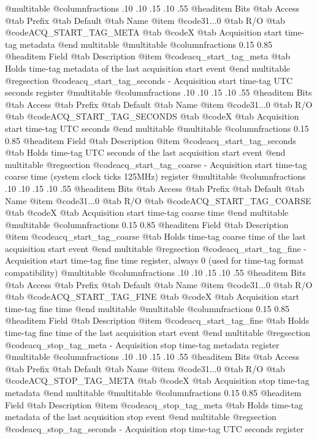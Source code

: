 @multitable @columnfractions .10 .10 .15 .10 .55
@headitem Bits @tab Access @tab Prefix @tab Default @tab Name
@item @code{31...0}
@tab R/O @tab
@code{ACQ_START_TAG_META}
@tab @code{X} @tab 
Acquisition start time-tag metadata
@end multitable
@multitable @columnfractions 0.15 0.85
@headitem Field @tab Description
@item @code{acq_start_tag_meta} @tab Holds time-tag metadata of the last acquisition start event
@end multitable
@regsection @code{acq_start_tag_seconds} - Acquisition start time-tag UTC seconds register
@multitable @columnfractions .10 .10 .15 .10 .55
@headitem Bits @tab Access @tab Prefix @tab Default @tab Name
@item @code{31...0}
@tab R/O @tab
@code{ACQ_START_TAG_SECONDS}
@tab @code{X} @tab 
Acquisition start time-tag UTC seconds
@end multitable
@multitable @columnfractions 0.15 0.85
@headitem Field @tab Description
@item @code{acq_start_tag_seconds} @tab Holds time-tag UTC seconds of the last acquisition start event
@end multitable
@regsection @code{acq_start_tag_coarse} - Acquisition start time-tag coarse time (system clock ticks 125MHz) register
@multitable @columnfractions .10 .10 .15 .10 .55
@headitem Bits @tab Access @tab Prefix @tab Default @tab Name
@item @code{31...0}
@tab R/O @tab
@code{ACQ_START_TAG_COARSE}
@tab @code{X} @tab 
Acquisition start time-tag coarse time
@end multitable
@multitable @columnfractions 0.15 0.85
@headitem Field @tab Description
@item @code{acq_start_tag_coarse} @tab Holds time-tag coarse time of the last acquisition start event
@end multitable
@regsection @code{acq_start_tag_fine} - Acquisition start time-tag fine time register, always 0 (used for time-tag format compatibility)
@multitable @columnfractions .10 .10 .15 .10 .55
@headitem Bits @tab Access @tab Prefix @tab Default @tab Name
@item @code{31...0}
@tab R/O @tab
@code{ACQ_START_TAG_FINE}
@tab @code{X} @tab 
Acquisition start time-tag fine time
@end multitable
@multitable @columnfractions 0.15 0.85
@headitem Field @tab Description
@item @code{acq_start_tag_fine} @tab Holds time-tag fine time of the last acquisition start event
@end multitable
@regsection @code{acq_stop_tag_meta} - Acquisition stop time-tag metadata register
@multitable @columnfractions .10 .10 .15 .10 .55
@headitem Bits @tab Access @tab Prefix @tab Default @tab Name
@item @code{31...0}
@tab R/O @tab
@code{ACQ_STOP_TAG_META}
@tab @code{X} @tab 
Acquisition stop time-tag metadata
@end multitable
@multitable @columnfractions 0.15 0.85
@headitem Field @tab Description
@item @code{acq_stop_tag_meta} @tab Holds time-tag metadata of the last acquisition stop event
@end multitable
@regsection @code{acq_stop_tag_seconds} - Acquisition stop time-tag UTC seconds register
